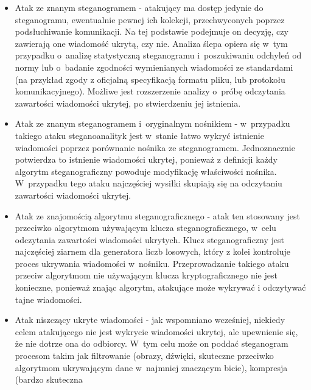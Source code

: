 \documentclass[a4paper, twoside, 12pt]{report}
\begin{document}
        \begin{itemize}
            \item Atak ze znanym steganogramem - atakujący ma dostęp jedynie do
                steganogramu, ewentualnie pewnej ich kolekcji, przechwyconych poprzez
                podsłuchiwanie komunikacji. Na tej podstawie podejmuje on decyzję,
                czy zawierają one wiadomość ukrytą, czy nie. Analiza ślepa opiera
                się w~tym przypadku o~analizę statystyczną steganogramu i~poszukiwaniu
                odchyleń od normy lub o~badanie zgodności wymienianych wiadomości
                ze standardami (na przykład zgody z oficjalną specyfikacją formatu pliku,
                lub protokołu komunikacyjnego). Możliwe jest rozszerzenie
                analizy o~próbę odczytania zawartości wiadomości ukrytej, po stwierdzeniu
                jej istnienia.
            \item Atak ze znanym steganogramem i~oryginalnym nośnikiem - w~przypadku
                takiego ataku steganoanalityk jest w~stanie łatwo wykryć istnienie
                wiadomości poprzez porównanie nośnika ze steganogramem. Jednoznacznie
                potwierdza to istnienie wiadomości ukrytej, ponieważ z definicji
                każdy algorytm steganograficzny powoduje modyfikację właściwości
                nośnika. W~przypadku tego ataku najczęściej wysiłki skupiają się
                na odczytaniu zawartości wiadomości ukrytej.
            \item Atak ze znajomością algorytmu steganograficznego - atak ten
                stosowany jest przeciwko algorytmom używającym klucza steganograficznego,
                w~celu odczytania zawartości wiadomości ukrytych. Klucz steganograficzny
                jest najczęściej ziarnem dla generatora liczb losowych, który z
                kolei kontroluje proces ukrywania wiadomości w~nośniku. Przeprowadzanie
                takiego ataku przeciw algorytmom nie używającym klucza kryptograficznego
                nie jest konieczne, ponieważ znając algorytm, atakujące może wykrywać i
                odczytywać tajne wiadomości.
            \item Atak niszczący ukryte wiadomości - jak wspomniano wcześniej, niekiedy
                celem atakującego nie jest wykrycie wiadomości ukrytej, ale upewnienie
                się, że nie dotrze ona do odbiorcy. W~tym celu może on poddać steganogram
                procesom takim jak filtrowanie (obrazy, dźwięki, skuteczne przeciwko
                algorytmom ukrywającym dane w~najmniej znaczącym bicie), kompresja (bardzo skuteczna

\end{itemize}
\end{document}
